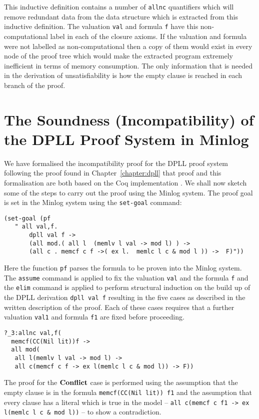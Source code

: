This inductive definition contains a number of \texttt{allnc} quantifiers which will remove redundant data from the data structure which is extracted from this inductive definition. The valuation \texttt{val} and formula \texttt{f} have this non-computational label in each of the closure axioms. If the valuation and formula were not labelled as non-computational then a copy of them would exist in every node of the proof tree which would make the extracted program extremely inefficient in terms of memory consumption. The only information that is needed in the derivation of unsatisfiability is how the empty clause is reached in each branch of the proof.


\section{The Soundness (Incompatibility) of the DPLL Proof System in Minlog}
We have formalised the incompatibility proof for the DPLL proof system following the proof found in Chapter~\ref{chapter:dpll} that proof and this formalisation are both based on the Coq implementation \cite{SL08}. We shall now sketch some of the steps to carry out the proof using the Minlog system.
The proof goal is set in the Minlog system using the \texttt{set-goal} command:

\begin{lstlisting}
(set-goal (pf 
   " all val,f.
       dpll val f ->  
       (all mod.( all l  (memlv l val -> mod l) ) -> 
       (all c . memcf c f ->( ex l.  memlc l c & mod l )) ->  F)"))
\end{lstlisting}

Here the function \texttt{pf} parses the formula to be proven into the Minlog system. The \texttt{assume} command is applied to fix the valuation \texttt{val} and the formula \texttt{f} and the \texttt{elim} command is applied to perform structural induction on the build up of the DPLL derivation \texttt{dpll val f} resulting in the five cases as described in the written description of the proof. Each of these cases requires that a further valuation \texttt{val1} and formula \texttt{f1} are fixed before proceeding.

\begin{lstlisting}[caption = "The Conflict Case in Minlog"]
?_3:allnc val,f(
  memcf(CC(Nil lit))f ->
  all mod(
   all l(memlv l val -> mod l) ->
   all c(memcf c f -> ex l(memlc l c & mod l)) -> F))
\end{lstlisting}

The proof for the $\mathbf{Conflict}$ case is performed using the assumption that the empty clause is in the formula \texttt{memcf(CC(Nil lit)) f1} and the assumption that every clause has a literal which is true in the model -- \texttt{all c(memcf c f1 -> ex l(memlc l c \& mod l))} -- to show a contradiction. 


